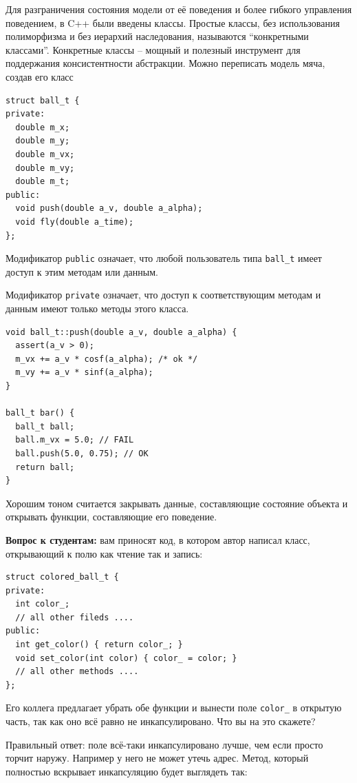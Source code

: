 \documentclass[a4paper,12pt,oneside]{book}
\newif\ifanswers
\begin{document}
Для разграничения состояния модели от её поведения и более гибкого управления поведением, в C++ были введены классы. Простые классы, без использования полиморфизма и без иерархий наследования, называются ``конкретными классами''. Конкретные классы -- мощный и полезный инструмент для поддержания консистентности абстракции. Можно переписать модель мяча, создав его класс

\begin{lstlisting}
struct ball_t {
private:
  double m_x;
  double m_y;
  double m_vx;
  double m_vy;
  double m_t;
public:
  void push(double a_v, double a_alpha);
  void fly(double a_time);
};
\end{lstlisting}

Модификатор \lstinline!public! означает, что любой пользователь типа \lstinline!ball_t! имеет доступ к этим методам или данным. 

Модификатор \lstinline!private! означает, что доступ к соответствующим методам и данным имеют только методы этого класса.

\begin{lstlisting}
void ball_t::push(double a_v, double a_alpha) {
  assert(a_v > 0);
  m_vx += a_v * cosf(a_alpha); /* ok */
  m_vy += a_v * sinf(a_alpha);
}

ball_t bar() {
  ball_t ball;
  ball.m_vx = 5.0; // FAIL
  ball.push(5.0, 0.75); // OK
  return ball;
}
\end{lstlisting}

Хорошим тоном считается закрывать данные, составляющие состояние объекта и открывать функции, составляющие его поведение.

\textbf{Вопрос к студентам:} вам приносят код, в котором автор написал класс, открывающий к полю как чтение так и запись:

\begin{lstlisting}
struct colored_ball_t {
private:
  int color_;
  // all other fileds ....
public:
  int get_color() { return color_; }
  void set_color(int color) { color_ = color; }
  // all other methods ....
};
\end{lstlisting}

Его коллега предлагает убрать обе функции и вынести поле \lstinline!color_! в открытую часть, так как оно всё равно не инкапсулировано. Что вы на это скажете?

\ifanswers
Правильный ответ: поле всё-таки инкапсулировано лучше, чем если просто торчит наружу. Например у него не может утечь адрес. Метод, который полностью вскрывает инкапсуляцию будет выглядеть так:
\end{document}
